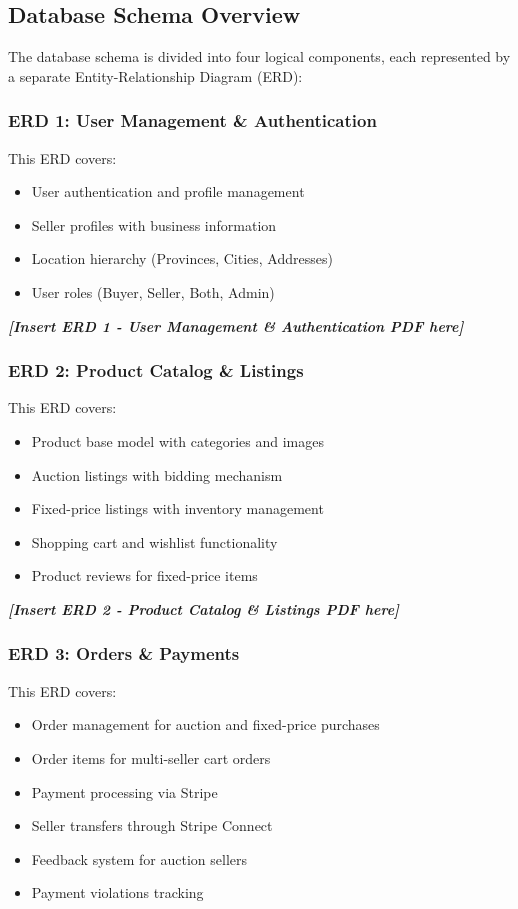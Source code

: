 \documentclass[12pt,a4paper]{article}
\begin{document}
\subsection{Database Schema Overview}

The database schema is divided into four logical components, each represented by a separate Entity-Relationship Diagram (ERD):

\subsubsection{ERD 1: User Management \& Authentication}
This ERD covers:
\begin{itemize}
    \item User authentication and profile management
    \item Seller profiles with business information
    \item Location hierarchy (Provinces, Cities, Addresses)
    \item User roles (Buyer, Seller, Both, Admin)
\end{itemize}

\newpage
\begin{center}
\textit{\textbf{[Insert ERD 1 - User Management \& Authentication PDF here]}}
\end{center}
\newpage

\subsubsection{ERD 2: Product Catalog \& Listings}
This ERD covers:
\begin{itemize}
    \item Product base model with categories and images
    \item Auction listings with bidding mechanism
    \item Fixed-price listings with inventory management
    \item Shopping cart and wishlist functionality
    \item Product reviews for fixed-price items
\end{itemize}

\newpage
\begin{center}
\textit{\textbf{[Insert ERD 2 - Product Catalog \& Listings PDF here]}}
\end{center}
\newpage

\subsubsection{ERD 3: Orders \& Payments}
This ERD covers:
\begin{itemize}
    \item Order management for auction and fixed-price purchases
    \item Order items for multi-seller cart orders
    \item Payment processing via Stripe
    \item Seller transfers through Stripe Connect
    \item Feedback system for auction sellers
    \item Payment violations tracking
\end{itemize}
\end{document}

